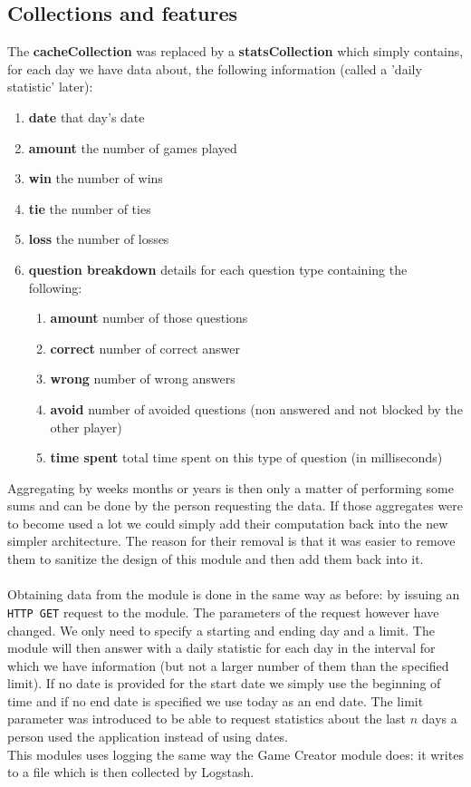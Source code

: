 \subsection{Collections and features}
The \textbf{cacheCollection} was replaced by a \textbf{statsCollection} which simply contains, for each day we have data about, the following information (called a 'daily statistic' later):
\begin{enumerate}
	\item \textbf{date} that day's date
	\item \textbf{amount} the number of games played
	\item \textbf{win} the number of wins
	\item \textbf{tie} the number of ties
	\item \textbf{loss} the number of losses
	\item \textbf{question breakdown} details for each question type containing the following:
	\begin{enumerate}
		\item \textbf{amount} number of those questions
		\item \textbf{correct} number of correct answer
		\item \textbf{wrong} number of wrong answers
		\item \textbf{avoid} number of avoided questions (non answered and not blocked by the other player)
		\item \textbf{time spent} total time spent on this type of question (in milliseconds)
	\end{enumerate}
\end{enumerate}
Aggregating by weeks months or years is then only a matter of performing some sums and can be done by the person requesting the data. If those aggregates were to become used a lot we could simply add their computation back into the new simpler architecture. The reason for their removal is that it was easier to remove them to sanitize the design of this module and then add them back into it.\\\\
Obtaining data from the module is done in the same way as before: by issuing an \texttt{HTTP GET} request to the module. The parameters of the request however have changed. We only need to specify a starting and ending day and a limit. The module will then answer with a daily statistic for each day in the interval for which we have information (but not a larger number of them than the specified limit). If no date is provided for the start date we simply use the beginning of time and if no end date is specified we use today as an end date. The limit parameter was introduced to be able to request statistics about the last $n$ days a person used the application instead of using dates.\\
This modules uses logging the same way the Game Creator module does: it writes to a file which is then collected by Logstash.

